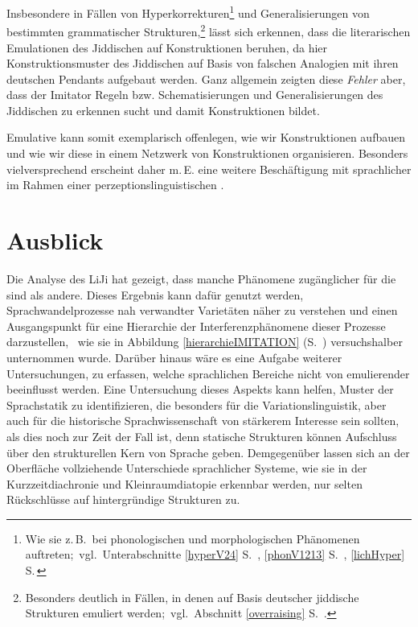 Insbesondere in Fällen von Hyperkorrekturen\footnote{Wie sie z.\,B.\, bei phonologischen und morphologischen Phänomenen auftreten;\, vgl.\, Unterabschnitte \ref{hyperV24} S.\, \pageref{hyperV24}, \ref{phonV1213} S.\, \pageref{phonV1213}, \ref{lichHyper} S.\, \pageref{lichHyper}} und Generalisierungen von bestimmten grammatischer Strukturen,\footnote{Besonders deutlich in Fällen, in denen auf Basis deutscher  jiddische Strukturen emuliert werden;\, vgl.\, Abschnitt \ref{overraising} S.\, \pageref{overraising}.} lässt sich erkennen, dass die literarischen Emulationen des Jiddischen auf Konstruktionen beruhen, da hier Konstruktionsmuster des Jiddischen auf Basis von falschen Analogien mit ihren deutschen Pendants aufgebaut werden. Ganz allgemein zeigten diese \textit{Fehler} aber, dass der Imitator Regeln bzw. Schematisierungen und Generalisierungen des Jiddischen zu erkennen sucht und damit Konstruktionen bildet. 


Emulative  kann somit exemplarisch offenlegen, wie wir Konstruktionen aufbauen und wie wir diese in einem Netzwerk von Konstruktionen organisieren. Besonders vielversprechend erscheint daher m.\,E. eine weitere Beschäftigung mit sprachlicher  im Rahmen einer perzeptionslinguistischen \hai{{\CxG}}. 



 \chapter{Ausblick}\label{the END}




  
\noindent Die Analyse des LiJi hat gezeigt, dass manche Phänomene zugänglicher für die  sind als andere. Dieses Ergebnis kann dafür genutzt werden,  Sprachwandelprozesse nah verwandter Varietäten näher zu verstehen und einen Ausgangspunkt für eine Hierarchie der Interferenzphänomene dieser Prozesse darzustellen, \,%
 wie sie in Abbildung \ref{hierarchieIMITATION} (S.\, \pageref{hierarchieIMITATION}) versuchshalber unternommen wurde. Darüber hinaus wäre es eine  Aufgabe weiterer Untersuchungen, zu erfassen, welche sprachlichen Bereiche nicht von emulierender  beeinflusst werden. Eine Untersuchung dieses Aspekts kann helfen, Muster der Sprachstatik zu identifizieren, die besonders für die Variationslinguistik, aber auch für die historische Sprachwissenschaft von stärkerem Interesse sein sollten, als dies noch zur Zeit der Fall ist, denn statische Strukturen können Aufschluss  über den strukturellen Kern von Sprache geben. Demgegenüber lassen sich an der Oberfläche vollziehende Unterschiede sprachlicher Systeme, wie sie in der Kurzzeitdiachronie und Kleinraumdiatopie erkennbar werden, nur selten  Rückschlüsse auf hintergründige Strukturen zu.


